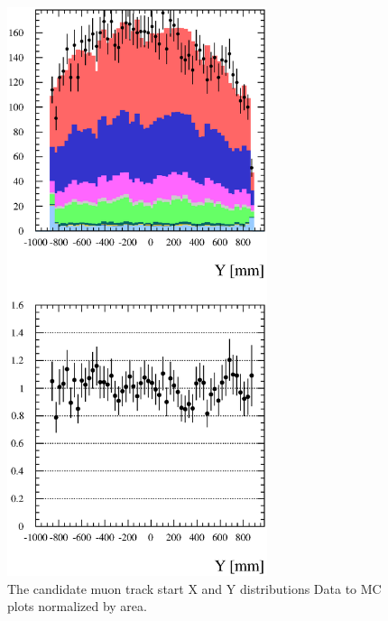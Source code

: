 \begin{figure}[h]
  \includegraphics[width=3in]{Figures/P0DTrkYRun1Run2-normByRatio.eps}
  \caption{The candidate muon track start X and Y distributions 
Data to MC plots normalized by area.}
  \label{fig:ResultsNorm}%
\end{figure}

